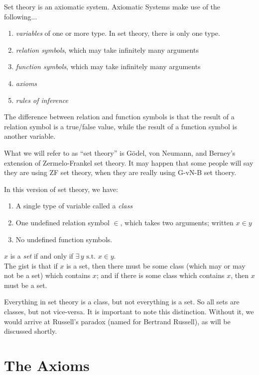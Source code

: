 \documentclass[12pt]{report}
\newcommand{\define}{  \noindent{\sc Definition }\hspace{5pt} }
\newcommand{\exst}{\exists\,}
\newcommand{\st}{\textrm{ s.t. }}
\begin{document}
Set theory is an axiomatic system. Axiomatic Systems make use of the
following...
\begin{enumerate}
\item {\em variables} of one or more type. In set theory, there is only one 
type.
\item {\em relation symbols}, which may take infinitely many arguments
\item {\em function symbols}, which may take infinitely many arguments
\item {\em axioms}
\item {\em rules of inference}
\end{enumerate}

The difference between relation and function symbols is that the
result of a relation symbol is a true/false value, while the result
of a function symbol is another variable.

What we will refer to as ``set theory'' is G\"odel, von Neumann, and
Berney's extension of Zermelo-Frankel set theory. It may happen that some
people will say they are using ZF set theory, when they are really using
G-vN-B set thoery.

In this version of set theory, we have:
\begin{enumerate}
\item A single type of variable called a  {\em class}
\item One undefined relation symbol $\in$, which takes two arguments; written
$x \in y$
\item No undefined function symbols.
\end{enumerate}

\define $x$ is a  {\em set} if and only if $\exst y \st x \in y$.\\

The gist is that if $x$ is a set, then there must be some class 
(which may or may not be a set) which contains $x$; and if there is some class 
which contains $x$, then $x$ must be a set.

Everything in set theory is a class, but not everything is a set. So all sets
are classes, but not vice-versa.  It is important to note this distinction. 
Without it, we would arrive at Russell's paradox 
(named for Bertrand Russell), as will be discussed shortly.

\section{The Axioms}
\end{document}

